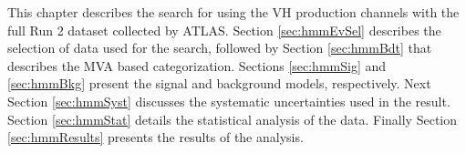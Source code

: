 This chapter describes the search for \hmm using the VH production channels with the full Run 2 dataset collected by ATLAS.
Section \ref{sec:hmmEvSel} describes the selection of data used for the search, followed by Section \ref{sec:hmmBdt} that describes the MVA based categorization.
Sections \ref{sec:hmmSig} and \ref{sec:hmmBkg} present the signal and background models, respectively.
Next Section \ref{sec:hmmSyst} discusses the systematic uncertainties used in the result.
Section \ref{sec:hmmStat} details the statistical analysis of the data.
Finally Section \ref{sec:hmmResults} presents the results of the analysis.









